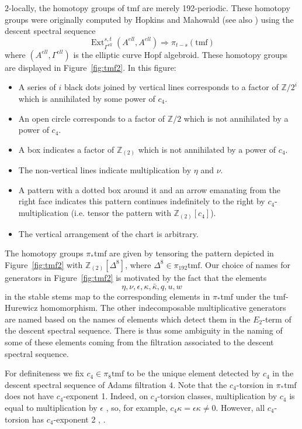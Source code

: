 \documentclass[10pt]{amsart}
\newcommand{\mit}[1]{\mathit{#1}}
\newcommand{\ZZ}{\mathbb{Z}}
\newcommand{\tmf}{\mathrm{tmf}}
\theoremstyle{definition}
\numberwithin{equation}{section}
\numberwithin{figure}{section}
\DeclareMathOperator{\Ext}{Ext}
\begin{document}
$2$-locally, the homotopy groups of $\tmf$ are merely 192-periodic.  These homotopy groups were originally computed by Hopkins and Mahowald \cite[Ch.~15]{tmf} (see also \cite{Bau08}) using the descent spectral sequence
$$ \Ext^{s,t}_{\Gamma^{\mit{ell}}}(A^{\mit{ell}}, A^{\mit{ell}}) \Rightarrow \pi_{t-s}(\tmf) $$
where $(A^{\mit{ell}}, \Gamma^{\mit{ell}})$ is the elliptic curve Hopf algebroid.
These homotopy groups are displayed in Figure~\ref{fig:tmf2}. In this figure:
\begin{itemize}
\item A series of $i$ black dots joined by vertical lines corresponds to a factor of $\ZZ/2^i$ which is annihilated by some power of $c_4$.

\item An open circle corresponds to a factor of $\ZZ/2$ which is not annihilated by a power of $c_4$.

\item A box indicates a factor of $\ZZ_{(2)}$ which is not annihilated by a power of $c_4$.

\item The non-vertical lines indicate multiplication by $\eta$ and $\nu$.

\item A pattern with a dotted box around it and an arrow emanating from the right face indicates this pattern continues indefinitely to the right by $c_4$-multiplication (i.e. tensor the pattern with $\ZZ_{(2)}[c_4]$).

\item The vertical arrangement of the chart is arbitrary.
\end{itemize}
The homotopy groups $\pi_*\tmf$ are given by tensoring the pattern depicted in Figure~\ref{fig:tmf2} with $\ZZ_{(2)}[\Delta^8]$, where $\Delta^8 \in \pi_{192}\tmf$.  Our choice of names for generators in Figure~\ref{fig:tmf2} is motivated by the fact that the elements
$$ \eta, \nu, \epsilon, \kappa, \bar{\kappa}, q, u, w $$
in the stable stems map to the corresponding elements in $\pi_*\tmf$ under the $\tmf$-Hurewicz homomorphism.  The other indecomposable multiplicative generators are named based on the names of elements which detect them in the $E_2$-term of the descent spectral sequence.  There is thus some ambiguity in the naming of some of these elements coming from the filtration associated to the descent spectral sequence.

For definiteness we fix $c_4 \in \pi_8\tmf$ to be the unique element detected by $c_4$ in the descent spectral sequence of Adams filtration $4$.
Note that the $c_4$-torsion in $\pi_*\tmf$ does not have $c_4$-exponent 1.  Indeed, on $c_4$-torsion classes, multiplication by $c_4$ is equal to multiplication by $\epsilon$ \cite[9.5]{BrunerRognes}, so, for example, $c_4\kappa = \epsilon\kappa \ne 0$.  However, all $c_4$-torsion has $c_4$-exponent 2 \cite[Prop.~6.1]{BHHM2}, \cite[9.5]{BrunerRognes}.
\end{document}
